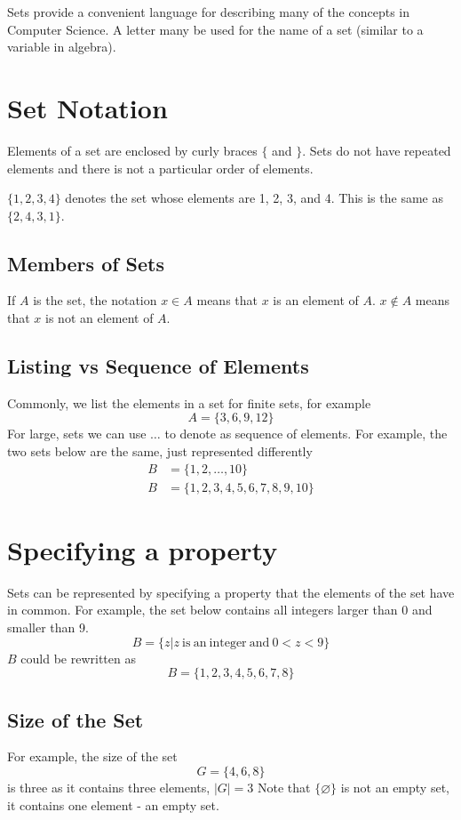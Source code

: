 
Sets provide a convenient language for describing many of the concepts in Computer Science. A letter many be used for the name of a set (similar to a variable in algebra).

\section*{Set Notation}
Elements of a set are enclosed by curly braces $\{$ and $\}$. Sets do not have repeated elements and there is not a particular order of elements. 

$\{1,2,3,4\}$ denotes the set whose elements are 1, 2, 3, and 4. This is the same as $\{2,4,3,1\}$. 
\subsection*{Members of Sets}
If $A$ is the set, the notation $x \in A$ means that $x$ is an element of $A$. $x \notin A$ means that $x$ is not an element of $A$. 
\subsection*{Listing vs Sequence of Elements}
Commonly, we list the elements in a set for finite sets, for example
\[A = \{3,6,9,12\}\]
For large, sets we can use $\ldots$ to denote as sequence of elements. For example, the two sets below are the same, just represented differently
\begin{align*}
B &= \{1, 2, \ldots, 10\}\\
B &= \{1, 2, 3, 4, 5, 6, 7, 8, 9, 10\}
\end{align*}

\section*{Specifying a property}
Sets can be represented by specifying a property that the elements of the set have in common. For example, the set below contains all integers larger than 0 and smaller than 9.
\[B = \{z | z \mathrm{\ is\ an\ integer\ and\ } 0<z<9 \}\]
$B$ could be rewritten as
\[B = \{1, 2, 3, 4, 5, 6, 7, 8\}\]

\subsection*{Size of the Set}
For example, the size of the set
\[G = \{4, 6, 8\}\]
is three as it contains three elements, $|G| = 3$
Note that $\{\varnothing\}$ is not an empty set, it contains one element - an empty set. 

